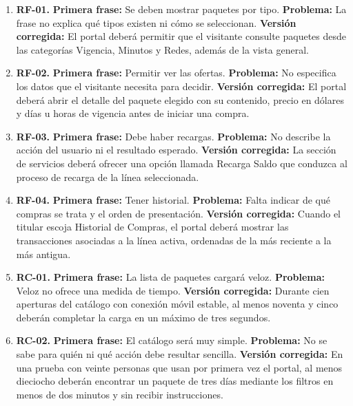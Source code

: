 \documentclass[12pt,a4paper]{article}
\begin{document}
\begin{enumerate}[leftmargin=*,itemsep=7pt]

\item \textbf{RF-01.} \textbf{Primera frase:} Se deben mostrar paquetes por tipo. \textbf{Problema:} La frase no explica qué tipos existen ni cómo se seleccionan. \textbf{Versión corregida:} El portal deberá permitir que el visitante consulte paquetes desde las categorías Vigencia, Minutos y Redes, además de la vista general.

\item \textbf{RF-02.} \textbf{Primera frase:} Permitir ver las ofertas. \textbf{Problema:} No especifica los datos que el visitante necesita para decidir. \textbf{Versión corregida:} El portal deberá abrir el detalle del paquete elegido con su contenido, precio en dólares y días u horas de vigencia antes de iniciar una compra.

\item \textbf{RF-03.} \textbf{Primera frase:} Debe haber recargas. \textbf{Problema:} No describe la acción del usuario ni el resultado esperado. \textbf{Versión corregida:} La sección de servicios deberá ofrecer una opción llamada Recarga Saldo que conduzca al proceso de recarga de la línea seleccionada.

\item \textbf{RF-04.} \textbf{Primera frase:} Tener historial. \textbf{Problema:} Falta indicar de qué compras se trata y el orden de presentación. \textbf{Versión corregida:} Cuando el titular escoja Historial de Compras, el portal deberá mostrar las transacciones asociadas a la línea activa, ordenadas de la más reciente a la más antigua.

\item \textbf{RC-01.} \textbf{Primera frase:} La lista de paquetes cargará veloz. \textbf{Problema:} Veloz no ofrece una medida de tiempo. \textbf{Versión corregida:} Durante cien aperturas del catálogo con conexión móvil estable, al menos noventa y cinco deberán completar la carga en un máximo de tres segundos.

\item \textbf{RC-02.} \textbf{Primera frase:} El catálogo será muy simple. \textbf{Problema:} No se sabe para quién ni qué acción debe resultar sencilla. \textbf{Versión corregida:} En una prueba con veinte personas que usan por primera vez el portal, al menos dieciocho deberán encontrar un paquete de tres días mediante los filtros en menos de dos minutos y sin recibir instrucciones.


\end{enumerate}
\end{document}
